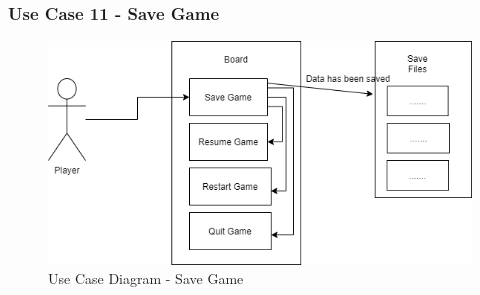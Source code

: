 \documentclass[12pt]{article}
\begin{document}
\newpage


\subsubsection{Use Case 11 - Save Game} \label{uc:11}

\begin{figure}[htbp]
    \centering
    \includegraphics[scale=0.6]{images/SaveGame.png}
    \caption{Use Case Diagram - Save Game}
    \label{fig:SaveGame}
\end{figure}
\end{document}
